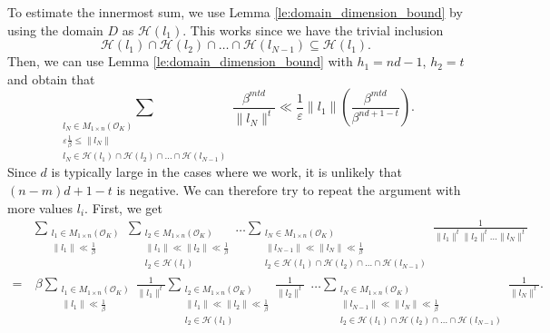 \documentclass{amsart}
\newcommand{\OK}{\mathcal{O}_K}
\begin{document}
To estimate the innermost sum, we use Lemma \ref{le:domain_dimension_bound} by using the domain $D$ as $\mathcal{H}(l_1)$. This works since we have the trivial inclusion
\begin{equation}
 \mathcal{H}(l_1)\cap \mathcal{H}(l_2) \cap \dots \cap \mathcal{H}(l_{N-1})  \subseteq \mathcal{H}(l_1).
\end{equation}
Then, we can use Lemma \ref{le:domain_dimension_bound} with $h_1=nd-1$, $h_2=t$ and obtain
that 
\begin{equation}
	\sum_{ \substack{l_N \in M_{1 \times n}(\OK) \\ 
			{\varepsilon}\frac{1}{\beta} \leq \|l_N\| 
\\ l_N \in \mathcal{H}(l_1)\cap \mathcal{H}(l_2) \cap \dots \cap \mathcal{H}(l_{N-1})  }}  
	\frac{\beta^{mtd}}{\|l_N\|^{t} }
\ll  \frac{1}{\varepsilon}\|l_1\|\left(\frac{\beta^{mtd}}{\beta ^{nd+1-t} } \right).
\end{equation}
Since $d$ is typically large in the cases where we work, it is unlikely that $(n-m)d+1-t$ is negative.
We can therefore try to repeat the argument with more values $l_{i}$. First, we get 
\begin{align}
	& \sum_{ \substack{l_1 \in M_{1 \times n}(\OK) \\ \|l_1\| \ll \frac{1}{\beta}  }}  
	\sum_{ \substack{l_2 \in M_{1 \times n}(\OK) \\ \|l_1\| \ll \|l_2\| \ll \frac{1}{\beta} \\ l_2 \in \mathcal{H}(l_1)  }}  
	\dots
	\sum_{ \substack{l_N \in M_{1 \times n}(\OK) \\ \|l_{N-1}\| \ll \|l_N\| \ll \frac{1}{\beta} \\ l_2 \in \mathcal{H}(l_1)\cap \mathcal{H}(l_2) \cap \dots \cap \mathcal{H}(l_{N-1})  }}  
	\frac{1}{\|l_1\|^{t} \|l_2\|^{t} \dots \|l_N\|^{t} }
	\\
	= 
	& \ 
	\beta 
	\sum_{ \substack{l_1 \in M_{1 \times n}(\OK) \\ \|l_1\| \ll \frac{1}{\beta}  }}  
	\frac{1}{\|l_1\|^{t}}
	\sum_{ \substack{l_2 \in M_{1 \times n}(\OK) \\ \|l_1\| \ll \|l_2\| \ll \frac{1}{\beta} \\ l_2 \in \mathcal{H}(l_1)  }}  \frac{1}{\|l_2\|^{t}} \ \ 
	\dots
	\sum_{ \substack{l_N \in M_{1 \times n}(\OK) \\ \|l_{N-1}\| \ll \|l_N\| \ll \frac{1}{\beta} \\ l_2 \in \mathcal{H}(l_1)\cap \mathcal{H}(l_2) \cap \dots \cap \mathcal{H}(l_{N-1})  }}  
	\frac{1}{\|l_N\|^{t} }.
\end{align}
\end{document}
